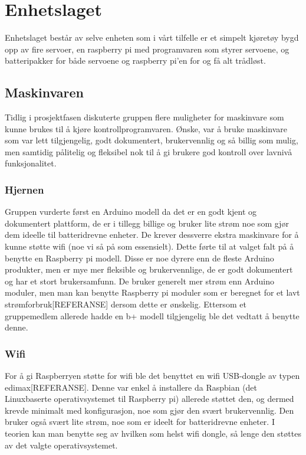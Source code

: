 \documentclass[12pt]{report}
\begin{document}
\chapter{Enhetslaget}
Enhetslaget består av selve enheten som i vårt tilfelle er et simpelt kjøretøy bygd opp av fire servoer, en raspberry pi med programvaren som styrer servoene, og batteripakker for både servoene og raspberry pi’en for og få alt trådløst.

\section{Maskinvaren}
Tidlig i prosjektfasen diskuterte gruppen flere muligheter for maskinvare som kunne brukes til å kjøre kontrollprogramvaren. Ønske, var å bruke maskinvare som var lett tilgjengelig, godt dokumentert, brukervennlig og så billig som mulig, men samtidig pålitelig og fleksibel nok til å gi brukere god kontroll over lavnivå funksjonalitet. 

\subsection{Hjernen}
Gruppen vurderte først en Arduino modell da det er en godt kjent og dokumentert plattform, de er i tillegg billige og bruker lite strøm noe som gjør dem ideelle til batteridrevne enheter. De krever dessverre ekstra maskinvare for å kunne støtte wifi (noe vi så på som essensielt). Dette førte til at valget falt på å benytte en Raspberry pi modell. Disse er noe dyrere enn de fleste Arduino produkter, men er mye mer fleksible og brukervennlige, de er godt dokumentert og har et stort brukersamfunn. De bruker generelt mer strøm enn Arduino moduler, men man kan benytte Raspberry pi moduler som er beregnet for et lavt strømforbruk[REFERANSE] dersom dette er ønskelig. Ettersom et gruppemedlem allerede hadde en b+ modell tilgjengelig ble det vedtatt å benytte denne.

\subsection{Wifi}
For å gi Raspberryen støtte for wifi ble det benyttet en wifi USB-dongle av typen edimax[REFERANSE]. Denne var enkel å installere da Raspbian (det Linuxbaserte operativsystemet til Raspberry pi) allerede støttet den, og dermed krevde minimalt med konfigurasjon, noe som gjør den svært brukervennlig. Den bruker også svært lite strøm, noe som er ideelt for batteridrevne enheter. I teorien kan man benytte seg av hvilken som helst wifi dongle, så lenge den støttes av det valgte operativsystemet.
\end{document}
